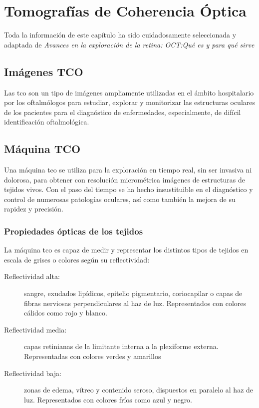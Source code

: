 \chapter{Tomografías de Coherencia Óptica}
Toda la información de este capítulo ha sido cuidadosamente
seleccionada y adaptada de \emph{Avances en la exploración de la
  retina: OCT:\@ Qué es y para qué sirve}\cite{oct-bib}

\section{Imágenes TCO}
Las \gls{tco} son un tipo de imágenes ampliamente utilizadas en el
ámbito hospitalario por los oftalmólogos para estudiar, explorar y monitorizar las
estructuras oculares de los pacientes para el diagnóstico de
enfermedades, especialmente, de difícil identificación oftalmológica.

\section{Máquina TCO}
Una máquina \gls{tco} se utiliza para la exploración en tiempo real, sin ser
invasiva ni dolorosa, para obtener con resolución micrométrica imágenes
de estructuras de tejidos vivos. Con el paso del tiempo se ha hecho
insustituible en el diagnóstico y control de numerosas patologías
oculares, así como también la mejora de su rapidez y precisión.

\subsection{Propiedades ópticas de los tejidos}
La máquina \gls{tco} es capaz de medir y representar los distintos
tipos de tejidos en escala de grises o colores según su reflectividad:
\begin{description}
\item[Reflectividad alta:] sangre, exudados lipídicos, epitelio
  pigmentario, coriocapilar o capas de fibras nerviosas
  perpendiculares al haz de luz. Representados con colores cálidos
  como rojo y blanco.
\item[Reflectividad media:] capas retinianas de la limitante interna a
  la plexiforme externa. Representadas con colores verdes y amarillos
\item[Reflectividad baja:] zonas de edema, vítreo y contenido seroso,
  dispuestos en paralelo al haz de luz. Representados con colores
  fríos como azul y negro.
\end{description}


